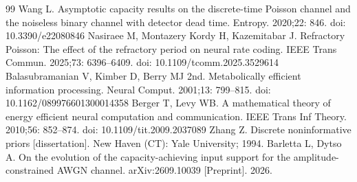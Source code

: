 \begin{thebibliography}{99}
 Wang L. Asymptotic capacity results on the discrete-time Poisson channel and the noiseless binary channel with detector dead time. Entropy. 2020;22: 846. doi: 10.3390/e22080846
 Nasiraee M, Montazery Kordy H, Kazemitabar J. Refractory Poisson: The effect of the refractory period on neural rate coding. IEEE Trans Commun. 2025;73: 6396--6409. doi: 10.1109/tcomm.2025.3529614
 Balasubramanian V, Kimber D, Berry MJ 2nd. Metabolically efficient information processing. Neural Comput. 2001;13: 799--815. doi: 10.1162/089976601300014358
 Berger T, Levy WB. A mathematical theory of energy efficient neural computation and communication. IEEE Trans Inf Theory. 2010;56: 852--874. doi: 10.1109/tit.2009.2037089
 Zhang Z. Discrete noninformative priors [dissertation]. New Haven (CT): Yale University; 1994.
 Barletta L, Dytso A. On the evolution of the capacity-achieving input support for the amplitude-constrained AWGN channel. arXiv:2609.10039 [Preprint]. 2026.
\end{thebibliography}
